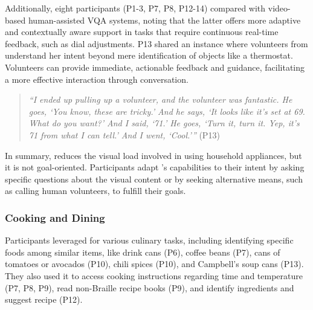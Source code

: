 

Additionally, eight participants (P1-3, P7, P8, P12-14) compared \bma{} with video-based human-assisted VQA systems, noting that the latter offers more adaptive and contextually aware support in tasks that require continuous real-time feedback, such as dial adjustments.
P13 shared an instance where volunteers from \bme{} understand her intent beyond mere identification of objects like a thermostat.
% 
Volunteers can provide immediate, actionable feedback and guidance, facilitating a more effective interaction through conversation.


\begin{quote}
    \textit{``I ended up pulling up a volunteer, and the volunteer was fantastic. He goes, `You know, these are tricky.' And he says, `It looks like it's set at 69. What do you want?' And I said, `71.' He goes, `Turn it, turn it. Yep, it's 71 from what I can tell.' And I went, `Cool.'''} (P13)
\end{quote}


In summary, \bma{} reduces the visual load involved in using household appliances, but it is not goal-oriented. Participants adapt \bma's capabilities to their intent by asking specific questions about the visual content or by seeking alternative means, such as calling human volunteers, to fulfill their goals.


\subsubsection{Cooking and Dining}
\label{cooking}
Participants leveraged \bma{} for various culinary tasks, including identifying specific foods among similar items, like drink cans (P6), coffee beans (P7), cans of tomatoes or avocados (P10), chili spices (P10), and Campbell's soup cans (P13). They also used it to access cooking instructions regarding time and temperature (P7, P8, P9), read non-Braille recipe books (P9), and identify ingredients and suggest recipe (P12).
% 




